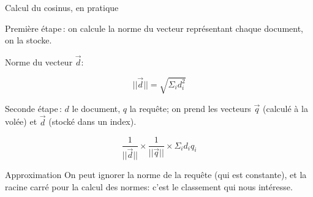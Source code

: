 \begin{frame}{Calcul du cosinus, en pratique}

\alert{Première étape}\,: on calcule la \alert{norme} du vecteur 
représentant chaque document, on la stocke.
\medskip

Norme du vecteur $\vec{d}$:

      $$||\vec{d}|| = \sqrt{\Sigma_i d_i^2}$$
      
\vfill
      
\alert{Seconde étape}\,: $d$ le document, $q$ la requête; on prend
les vecteurs $\vec{q}$ (calculé à la volée) et $\vec{d}$ (stocké dans un \alert{index}). 
      
\[
      \frac{1}{||\vec{d}||} \times \frac{1}{||\vec{q}||}         \times \Sigma_i d_i q_i
\]      
      
\begin{block}{Approximation}
On peut ignorer la norme de la requête (qui est constante), et la racine carré
pour la calcul des normes: c'est le classement qui nous intéresse.
\end{block}
           
\end{frame}

